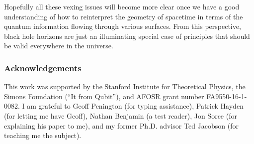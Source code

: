 \documentclass[12pt,a4paper]{article}
\begin{document}
Hopefully all these vexing issues will become more clear once we have a good understanding of how to reinterpret the geometry of spacetime in terms of the quantum information flowing through various surfaces.  From this perspective, black hole horizons are just an illuminating special case of principles that should be valid everywhere in the universe.

\subsubsection*{Acknowledgements}
{\small
This work was supported by the Stanford Institute for Theoretical Physics, the Simons Foundation (``It from Qubit''), and AFOSR grant number FA9550-16-1-0082.  I am grateful to Geoff Penington (for typing assistance), Patrick Hayden (for letting me have Geoff), Nathan Benjamin (a test reader), Jon Sorce (for explaining his paper to me), and my former Ph.D. advisor Ted Jacobson (for teaching me the subject).  
}



\end{document}
